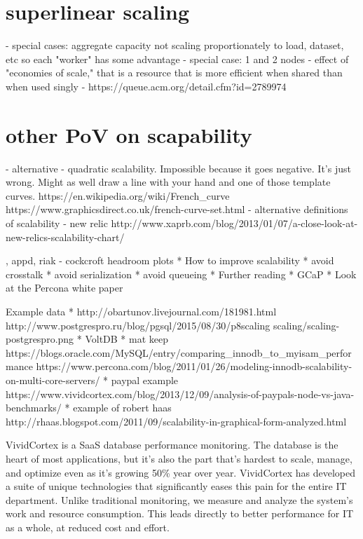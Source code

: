 \documentclass{vivid_layout}
\begin{document}
\section{superlinear scaling}
	- special cases: aggregate capacity not scaling proportionately to load,
	dataset, etc so each "worker" has some advantage
	- special case: 1 and 2 nodes
	- effect of "economies of scale," that is a resource that is more efficient
	when shared than when used singly
	- https://queue.acm.org/detail.cfm?id=2789974
\section{other PoV on scapability}
	- alternative - quadratic scalability. Impossible because it goes negative.
	It's just wrong. Might as well draw a line with your hand and one of those
	template curves. https://en.wikipedia.org/wiki/French\_curve
	https://www.graphicsdirect.co.uk/french-curve-set.html
	- alternative definitions of scalability - new relic
	 http://www.xaprb.com/blog/2013/01/07/a-close-look-at-new-relics-scalability-chart/

	, appd, riak
	- cockcroft headroom plots
* How to improve scalability
    * avoid crosstalk
	     * avoid serialization
		      * avoid queueing
* Further reading
				    * GCaP
					     * Look at the Percona white paper


Example data
* http://obartunov.livejournal.com/181981.html
  http://www.postgrespro.ru/blog/pgsql/2015/08/30/p8scaling
  scaling/scaling-postgrespro.png
* VoltDB
* mat keep
https://blogs.oracle.com/MySQL/entry/comparing\_innodb\_to\_myisam\_performance
https://www.percona.com/blog/2011/01/26/modeling-innodb-scalability-on-multi-core-servers/
* paypal example
https://www.vividcortex.com/blog/2013/12/09/analysis-of-paypals-node-vs-java-benchmarks/
* example of robert haas
http://rhaas.blogspot.com/2011/09/scalability-in-graphical-form-analyzed.html


\newpage

\begin{about}	%
VividCortex is a SaaS database performance monitoring. The database is the heart of most applications, but it's also the part that's hardest to scale, manage, and optimize even as it's growing 50\% year over year. VividCortex has developed a suite of unique technologies that significantly eases this pain for the entire IT department. Unlike traditional monitoring, we measure
and analyze the system's work and resource consumption. This leads directly to better performance for IT as a whole, at reduced cost and effort.
\end{about}
\makeresources	%
\end{document}
